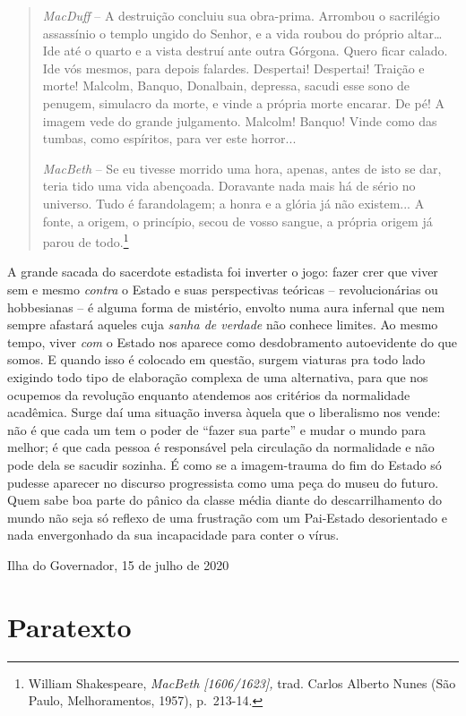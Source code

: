 \begin{quote}
\emph{MacDuff} -- A destruição concluiu sua obra-prima. Arrombou o
sacrilégio assassínio o templo ungido do Senhor, e a vida roubou do
próprio altar\ldots{} Ide até o quarto e a vista destruí ante outra
Górgona. Quero ficar calado. Ide vós mesmos, para depois falardes.
Despertai! Despertai! Traição e morte! Malcolm, Banquo, Donalbain,
depressa, sacudi esse sono de penugem, simulacro da morte, e vinde a
própria morte encarar. De pé! A imagem vede do grande julgamento.
Malcolm! Banquo! Vinde como das tumbas, como espíritos, para ver este
horror...~

\emph{MacBeth} -- Se eu tivesse morrido uma hora, apenas, antes de isto
se dar, teria tido uma vida abençoada. Doravante nada mais há de sério
no universo. Tudo é farandolagem; a honra e a glória já não existem... A
fonte, a origem, o princípio, secou de vosso sangue, a própria origem já
parou de todo.\footnote{William Shakespeare, \emph{MacBeth
  {[}1606/1623{]},} trad. Carlos Alberto Nunes (São Paulo,
  Melhoramentos, 1957), p.~213-14.}
\end{quote}

A grande sacada do sacerdote estadista foi inverter o jogo: fazer crer
que viver sem e mesmo \emph{contra} o Estado e suas perspectivas
teóricas -- revolucionárias ou hobbesianas -- é alguma forma de
mistério, envolto numa aura infernal que nem sempre afastará aqueles
cuja \emph{sanha de verdade} não conhece limites. Ao mesmo tempo, viver
\emph{com} o Estado nos aparece como desdobramento autoevidente do que
somos. E quando isso é colocado em questão, surgem viaturas pra todo
lado exigindo todo tipo de elaboração complexa de uma alternativa, para
que nos ocupemos da revolução enquanto atendemos aos critérios da
normalidade acadêmica. Surge daí uma situação inversa àquela que o
liberalismo nos vende: não é que cada um tem o poder de ``fazer sua
parte'' e mudar o mundo para melhor; é que cada pessoa é responsável
pela circulação da normalidade e não pode dela se sacudir sozinha. É
como se a imagem-trauma do fim do Estado só pudesse aparecer no discurso
progressista como uma peça do museu do futuro. Quem sabe boa parte do
pânico da classe média diante do descarrilhamento do mundo não seja só
reflexo de uma frustração com um Pai-Estado desorientado e nada
envergonhado da sua incapacidade para conter o vírus.

Ilha do Governador, 15 de julho de 2020

\hypertarget{paratexto}{%
\chapter{Paratexto}\label{paratexto}}

